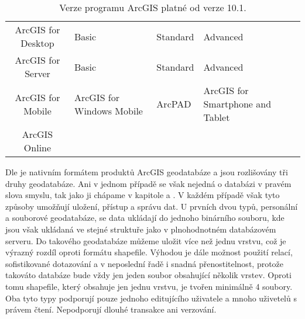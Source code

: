         \begin{table}[H]
          \caption{Verze programu ArcGIS platné od verze 10.1.}
          \label{verzeArcGIS}
          \begin{footnotesize}
            \begin{center}
              \begin{tabular}{|>{\centering} c |>{\centering}m{9.5em}  m{8.5em}  <{\centering} m{11em}  <{\centering}|}
                \hline
                {\bf \color{purpurova7}Produkt}	& \multicolumn{3}{c|}{\bf \color{purpurova7}Verze} \\
                \hline
                ArcGIS for Desktop & Basic & Standard & Advanced \\
                 ArcGIS for Server &	Basic &	Standard &	Advanced \\
                 ArcGIS for Mobile &	ArcGIS for Windows Mobile &	ArcPAD &	ArcGIS for Smartphone and Tablet \\
                   ArcGIS Online   & & &	\\	
                \hline
              \end{tabular}
            \end{center}
          \end{footnotesize}
        \end{table}

        Dle \cite{Law2008} je nativním formátem produktů ArcGIS geodatabáze a
        jsou rozlišovány tři druhy geodatabáze. Ani v jednom případě se však
        nejedná o databázi v pravém slova smyslu, tak jako ji chápame v
        kapitole  a . V každém případě však tyto způsoby umožňují
        uložení, přístup a správu dat. U prvních dvou typů, personální a
        souborové geodatabáze, se data ukládají do jednoho binárního souboru,
        kde jsou však ukládaná ve stejné struktuře jako v plnohodnotném
        databázovém serveru. Do takového geodatabáze můžeme uložit více než
        jednu vrstvu, což je výrazný rozdíl oproti formátu shapefile. Výhodou
        je dále možnost použití relací, sofistikované dotazování a v neposlední
        řadě i snadná přenostitelnost, protože takováto databáze bude vždy jen
        jeden soubor obsahující několik vrstev. Oproti tomu shapefile, který
        obsahuje jen jednu vrstvu, je tvořen minimálně 4 soubory. Oba tyto typy
        podporují pouze jednoho editujícího uživatele a mnoho uživetelů s
        právem čtení. Nepodporují dlouhé transakce ani verzování. 


